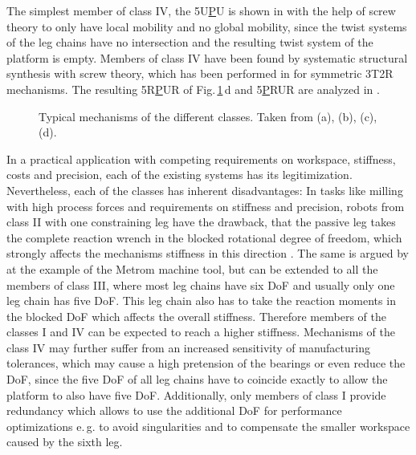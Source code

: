 \documentclass[robotics,article,submit,moreauthors,pdftex]{Definitions/mdpi}
\begin{document}
The simplest member of class IV, the 5U\underline{P}U is shown in \cite{HuangLi2002} with the help of screw theory to only have local mobility and no global mobility, since the twist systems of the leg chains have no intersection and the resulting twist system of the platform is empty.
Members of class IV have been found by systematic structural synthesis with screw theory, which has been performed in \cite{KongGos2005} for symmetric 3T2R mechanisms.
The resulting 5R\underline{P}UR of Fig.\,\ref{fig:systems_pictures}\,d and 5\underline{P}RUR are analyzed in \cite{Tale-MasoulehGos2011,Tale-MasoulehSaaGosTag2010}.
%
\begin{figure}[h!]
	
	\caption{Typical mechanisms of the different classes. Taken from \cite{ZhangGos2001} (a), \cite{MbarekNefCor2005} (b), \cite{AlaghebandMahMilBen2015} (c), \cite{Tale-MasoulehGos2011} (d).}
	\label{fig:systems_pictures}
	\vspace{-0.4cm}	%
\end{figure} 
\newpage
%
In a practical application with competing requirements on workspace, stiffness, costs and precision, each of the existing systems has its legitimization.
Nevertheless, each of the classes has inherent disadvantages:
In tasks like milling with high process forces and requirements on stiffness and precision, robots from class II with one constraining leg have the drawback, that the passive leg takes the complete reaction wrench in the blocked rotational degree of freedom, which strongly affects the mechanisms stiffness in this direction \cite{ZhangGos2001}.
The same is argued by \cite{LinLiYanZha2013} at the example of the Metrom machine tool, but can be extended to all the members of class III, where most leg chains have six DoF and usually only one leg chain has five DoF.
This leg chain also has to take the reaction moments in the blocked DoF which affects the overall stiffness.
Therefore\added[id=Sp]{,} members of the classes I and IV can be expected to reach a higher stiffness.
Mechanisms of the class IV may further suffer from an increased sensitivity of manufacturing tolerances, which may cause a high pretension of the bearings or even reduce the DoF, since the five DoF of all leg chains have to coincide exactly to allow the platform to also have five DoF.
Additionally, only members of class I provide redundancy which allows to use the additional DoF for performance optimizations e.\,g. to avoid singularities and to compensate the smaller workspace caused by the sixth leg.
\end{document}
